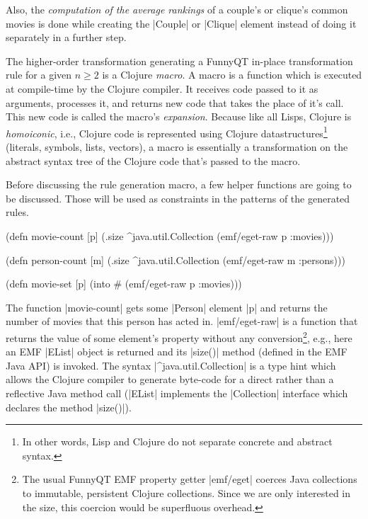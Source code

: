 \documentclass[a4paper]{article}
\newcommand{\code}{\clojureinline}
\begin{document}
Also, the \emph{computation of the average rankings} of a couple's or clique's
common movies is done while creating the \code|Couple| or \code|Clique| element
instead of doing it separately in a further step.

The higher-order transformation generating a FunnyQT in-place transformation
rule for a given \(n \geq 2\)
is a Clojure \emph{macro}.  A macro is a function which is executed at
compile-time by the Clojure compiler.  It receives code passed to it as
arguments, processes it, and returns new code that takes the place of it's
call.  This new code is called the macro's \emph{expansion}.  Because like all
Lisps, Clojure is \emph{homoiconic}, i.e., Clojure code is represented using
Clojure datastructures\footnote{In other words, Lisp and Clojure do not
  separate concrete and abstract syntax.} (literals, symbols, lists, vectors),
a macro is essentially a transformation on the abstract syntax tree of the
Clojure code that's passed to the macro.

Before discussing the rule generation macro, a few helper functions are going
to be discussed.  Those will be used as constraints in the patterns of the
generated rules.

\begin{clojurecode}
(defn movie-count [p]
  (.size ^java.util.Collection (emf/eget-raw p :movies)))

(defn person-count [m]
  (.size ^java.util.Collection (emf/eget-raw m :persons)))

(defn movie-set [p]
  (into #{} (emf/eget-raw p :movies)))
\end{clojurecode}

The function \code|movie-count| gets some \code|Person| element \code|p| and
returns the number of movies that this person has acted in.
\code|emf/eget-raw| is a function that returns the value of some element's
property without any conversion\footnote{The usual FunnyQT EMF property getter
  \code|emf/eget| coerces Java collections to immutable, persistent Clojure
  collections.  Since we are only interested in the size, this coercion would
  be superfluous overhead.}, e.g., here an EMF \code|EList| object is returned
and its \code|size()| method (defined in the EMF Java API) is invoked.  The
syntax \code|^java.util.Collection| is a type hint which allows the Clojure
compiler to generate byte-code for a direct rather than a reflective Java
method call (\code|EList| implements the \code|Collection| interface which
declares the method \code|size()|).
\end{document}
